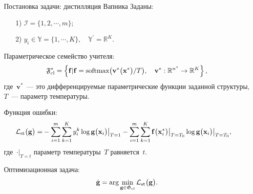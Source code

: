 \documentclass[10pt,pdf,hyperref={unicode}]{beamer}
\begin{document}
\begin{frame}{Постановка задачи: дистилляция Вапника}
\justifying
Заданы:
\begin{enumerate}
	\item[1)] $\mathcal{I} = \{1, 2, \cdots, m\}$;
	\item[2)] $y_i \in \mathbb{Y}=\{1, \cdots, K\}, \quad \mathbb{Y}^\prime=\mathbb{R}^{K}$.
\end{enumerate}

\bigskip

Параметрическое семейство учителя:
\[
\setlength\abovedisplayskip{0pt}
\mathfrak{F}_{\text{cl}}^* = \left\{\mathbf{f}| \mathbf{f} = \text{softmax}\bigr(\mathbf{v}^*\bigr(\mathbf{x}^*\bigr)/T\bigr), \quad \mathbf{v}^*: \mathbb{R}^{n^*} \to \mathbb{R}^K \right\},
\setlength\belowdisplayskip{0pt}
\]
где~$\mathbf{v}^*$~--- это дифференцируемые параметрические функции заданной структуры, $T$~--- параметр температуры.

\bigskip

Функция ошибки:
\[
\setlength\abovedisplayskip{0pt}
\begin{aligned}
   \mathcal{L}_\text{st}\bigr(\mathbf{g}\bigr) = &-\sum_{i=1}^{m}{\sum_{k=1}^{K}y^k_i\log\mathbf{g}\bigr(\mathbf{x}_i\bigr)\bigr|_{T=1}}-\sum_{i=1}^{m}{\sum_{k=1}^{K}\mathbf{f}\bigr(\mathbf{x}^*_i\bigr)\bigr|_{T=T_0}\log\mathbf{g}\bigr(\mathbf{x}_i\bigr)\bigr|_{T=T_0}},
\end{aligned}
\setlength\belowdisplayskip{0pt}
\]
где~$\cdot\bigr|_{T=t}$ параметр температуры~$T$ равняется~$t$.

\bigskip

Оптимизационная задача:
\[
\setlength\abovedisplayskip{0pt}
	\hat{\mathbf{g}} = \arg\min_{\mathbf{g} \in \mathfrak{G}_{\text{cl}}} \mathcal{L}_\text{st}\bigr(\mathbf{g}\bigr).\setlength\belowdisplayskip{0pt}
\]

\end{frame}
\end{document}
